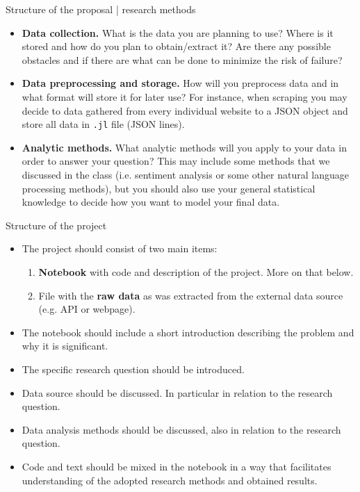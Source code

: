 \begin{frame}{Structure of the proposal | research methods}
\begin{itemize}
 \item \textbf{Data collection.} What is the data you are planning to use?
 Where is it stored and how do you plan to obtain/extract it?
 Are there any possible obstacles and if there are what can be done to minimize the risk of failure?
 \item \textbf{Data preprocessing and storage.}
 How will you preprocess data and in what format will store it for later use? For instance, when scraping you may decide to data gathered from
 every individual website to a JSON object and store all data in
 \texttt{.jl} file (JSON lines).
 \item \textbf{Analytic methods.}
 What analytic methods will you apply to your data in order to answer your question? This may include some methods that we discussed in the class
 (i.e. sentiment analysis or some other natural language processing methods),
 but you should also use your general statistical knowledge to decide how you want to model your final data.
\end{itemize}
\end{frame}

\begin{frame}{Structure of the project}
\begin{itemize}
 \item The project should consist of two main items:
 \begin{enumerate}
 \item \textbf{Notebook} with code and description of the project.
 More on that below.
 \item File with the \textbf{raw data} as was extracted from the external data source (e.g. API or webpage).
 \end{enumerate}
 \item The notebook should include a short introduction describing the problem and why it is significant.
 \item The specific research question should be introduced.
 \item Data source should be discussed. In particular in relation to the research question.
 \item Data analysis methods should be discussed, also in relation to the research question.
 \item Code and text should be mixed in the notebook in a way that facilitates understanding of the adopted research methods and obtained results.
\end{itemize}
\end{frame}


